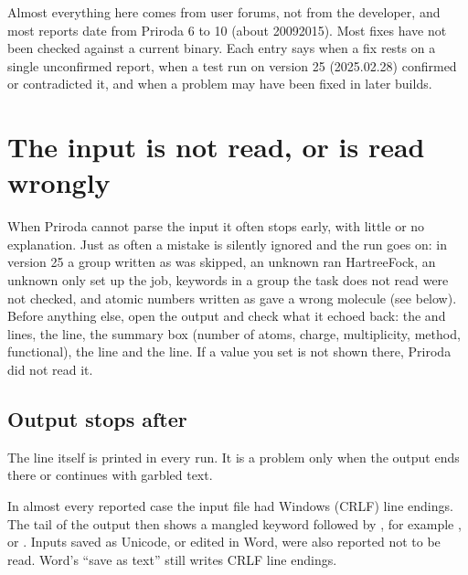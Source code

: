 \documentclass[letterpaper,10pt,english,openany,oneside]{sphinxmanual}
\begin{document}
\sphinxAtStartPar
Almost everything here comes from user forums, not from the developer, and most reports date from Priroda 6 to 10
(about 2009\textendash{}2015). Most fixes have not been checked against a current binary. Each entry says when a fix rests on a
single unconfirmed report, when a test run on version 25 (2025.02.28) confirmed or contradicted it, and when a
problem may have been fixed in later builds.


\section{The input is not read, or is read wrongly}
\label{\detokenize{troubleshooting/common-problems:the-input-is-not-read-or-is-read-wrongly}}\label{\detokenize{troubleshooting/common-problems:troubleshooting-input}}
\sphinxAtStartPar
When Priroda cannot parse the input it often stops early, with little or no explanation. Just as often a mistake is
silently ignored and the run goes on: in version 25 a group written as  was skipped, an unknown  ran
Hartree\textendash{}Fock, an unknown  only set up the job, keywords in a group the task does not read were not checked,
and atomic numbers written as  gave a wrong molecule (see below). Before anything else, open the output and check
what it echoed back: the  and  lines, the  line, the summary box (number of atoms, charge,
multiplicity, method, functional), the  line and the  line. If a value you set is not shown there,
Priroda did not read it.




\subsection{Output stops after }
\label{\detokenize{troubleshooting/common-problems:output-stops-after-molecule-input}}
\sphinxAtStartPar
The line  itself is printed in every run. It is a problem only when the output ends there or
continues with garbled text.



\sphinxAtStartPar
{} In almost every reported case the input file had Windows (CRLF) line endings. The tail of the output then
shows a mangled keyword followed by , for example ,  or . Inputs saved as
Unicode, or edited in Word, were also reported not to be read. Word’s “save as text” still writes CRLF line endings.
\end{document}
